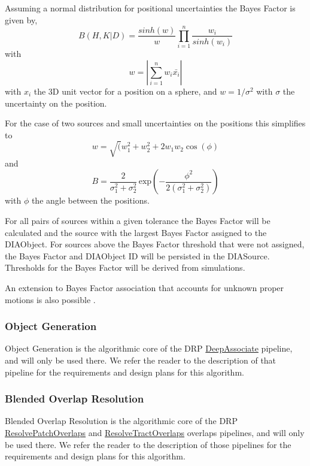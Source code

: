 Assuming a normal distribution for positional uncertainties the Bayes
Factor is given by,
\begin{equation}
B(H,K|D) = \frac{sinh (w)}{w} \prod_{i=1}^n \frac{w_i}{sinh (w_i)}
\end{equation}
with
\begin{equation}
w = |\sum_{i=1}^n w_i \bar{x_i} |
\end{equation}
with $x_i$ the 3D unit vector for a position on a sphere, and
$w=1/\sigma^2$ with $\sigma$ the uncertainty on the position.

For the case of two sources and small uncertainties on the positions this simplifies to
\begin{equation}
w = \sqrt(w_1^2 + w_2^2 +2 w_1 w_2 \cos(\phi)
\end{equation}
and
\begin{equation}
B=\frac{2}{\sigma_1^2 + \sigma_2^2} \, \textrm{exp}(-\frac{\phi^2}{2(\sigma_1^2 + \sigma_2^2)})
\end{equation}
with $\phi$ the angle between the positions.

For all pairs of sources within a given tolerance the Bayes Factor
will be calculated and the source with the largest Bayes Factor
assigned to the DIAObject. For sources above the Bayes Factor
threshold that were not assigned, the Bayes Factor and DIAObject ID
will be persisted in the DIASource. Thresholds for the Bayes Factor
will be derived from simulations.

An extension to Bayes Factor association that accounts for unknown
proper motions is also possible \citep{2010ApJ...719...59K}.


\subsubsection{Object Generation}
\label{sec:acObjectGeneration}

Object Generation is the algorithmic core of the DRP \hyperref[sec:drpDeepAssociate]{DeepAssociate} pipeline, and will only be used there.  We refer the reader to the description of that pipeline for the requirements and design plans for this algorithm.

\subsubsection{Blended Overlap Resolution}
\label{sec:acBlendedOverlapResolution}

Blended Overlap Resolution is the algorithmic core of the DRP \hyperref[sec:drpResolvePatchOverlaps]{ResolvePatchOverlaps} and \hyperref[sec:drpResolveTractOverlaps]{ResolveTractOverlaps} overlaps pipelines, and will only be used there.  We refer the reader to the description of those pipelines for the requirements and design plans for this algorithm.

